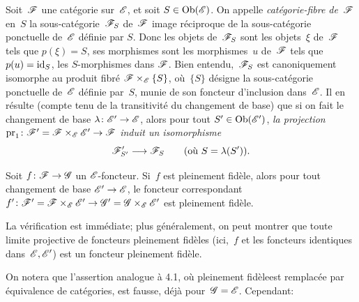 Soit~$\cal{F}$ une cat\'egorie sur~$\cal{E}$, et soit $S \in
\Ob({\cal{E}})$. On appelle \emph{catégorie-fibre de}~$\cal{F}$
en~$S$
la sous-cat\'egorie~$\cal{F}_S$
\label{indnot:fn}de~$\cal{F}$ image r\'eciproque de la
sous-cat\'egorie ponctuelle de~$\cal{E}$ d\'efinie par $S$. Donc
les objets de~$\cal{F}_S$ sont les objets~$\xi$ de~$\cal{F}$ tels que
$p(\xi)=S$, ses morphismes sont les morphismes~$u$ de~$\cal{F}$ tels
que $p(u)=\mathrm{id}_S$, \ie les $S$-morphismes dans $\cal{F}$. Bien
entendu,~$\cal{F}_S$ est canoniquement isomorphe au produit fibr\'e
$\cal{F} \times_{\cal{E}} \{S\}$, o\`u~$\{S\}$ d\'esigne la
sous-cat\'egorie ponctuelle de~$\cal{E}$ d\'efinie par~$S$, munie
de son foncteur d'inclusion dans~$\cal{E}$. Il en r\'esulte (compte
tenu de la transitivit\'e du changement de base) que si on fait le
changement de base $\lambda\colon \cal{E}' \to \cal{E}$, alors pour
tout $S' \in \Ob(\cal{E}')$, \emph{la projection $\pr_1\colon
\cal{F}' = \cal{F} \times_{\cal{E}} \cal{E}' \to \cal{F}$ induit un
isomorphisme}
$$
\cal{F}'_{S'} \to \cal{F}_S \qquad (\text{où $S=\lambda(S')$}).
$$

\begin{proposition}
\label{VI.4.1} Soit $f\colon \cal{F} \to \cal{G}$ un
$\cal{E}$-foncteur. Si~$f$ est pleinement fid\`ele, alors pour tout
changement de base $\cal{E}' \to \cal{E}$, le foncteur correspondant
$f' \colon \cal{F}' = \cal{F} \times_{\cal{E}} \cal{E}' \to \cal{G}' =
\cal{G} \times_{\cal{E}} \cal{E}'$ est pleinement fid\`ele.
\end{proposition}

La v\'erification est imm\'ediate; plus g\'en\'eralement, on
peut montrer que toute limite projective de
foncteurs
pleinement
fid\`eles
(ici,~$f$ et les foncteurs identiques
dans~$\cal{E},\cal{E}'$) est un foncteur pleinement fid\`ele.

On notera que l'assertion analogue \`a 4.1,
o\`u
\og pleinement fid\`ele\fg est remplac\'ee par \og \'equi\-va\-lence
de cat\'egories\fg, est fausse, d\'ej\`a pour~$\cal{G}=\cal{E}$.
Cependant:

